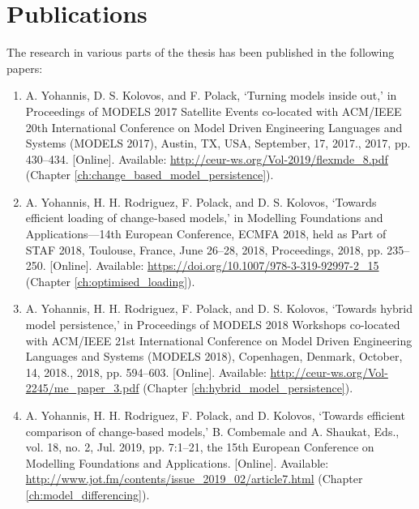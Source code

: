 \section{Publications}
\label{sec:publications}
The research in various parts of the thesis has been published in the following papers:
\begin{enumerate}
  \item A. Yohannis, D. S. Kolovos, and F. Polack, ‘Turning models inside out,’ in Proceedings of MODELS 2017 Satellite Events co-located with ACM/IEEE 20th International Conference on Model Driven Engineering Languages and Systems (MODELS 2017), Austin, TX, USA, September, 17, 2017., 2017, pp. 430–434. [Online]. Available: \url{http://ceur-ws.org/Vol-2019/flexmde_8.pdf} (Chapter \ref{ch:change_based_model_persistence}).
  
  \item A. Yohannis, H. H. Rodriguez, F. Polack, and D. S. Kolovos, ‘Towards efficient loading of change-based models,’ in Modelling Foundations and Applications—14th European Conference, ECMFA 2018, held as Part of STAF 2018, Toulouse, France, June 26–28, 2018, Proceedings, 2018, pp. 235–250. [Online]. Available: \url{https://doi.org/10.1007/978-3-319-92997-2_15} (Chapter \ref{ch:optimised_loading}).
  
  \item A. Yohannis, H. H. Rodriguez, F. Polack, and D. S. Kolovos, ‘Towards hybrid model persistence,’ in Proceedings of MODELS 2018 Workshops co-located with ACM/IEEE 21st International Conference on Model Driven Engineering Languages and Systems (MODELS 2018), Copenhagen, Denmark, October, 14, 2018., 2018, pp. 594–603. [Online]. Available: \url{http://ceur-ws.org/Vol-2245/me_paper_3.pdf} (Chapter \ref{ch:hybrid_model_persistence}).
  
  \item A. Yohannis, H. H. Rodriguez, F. Polack, and D. Kolovos, ‘Towards efficient comparison of change-based models,’ B. Combemale and A. Shaukat, Eds., vol. 18, no. 2, Jul. 2019, pp. 7:1–21, the 15th European Conference on Modelling Foundations and Applications. [Online]. Available:
  \url{http://www.jot.fm/contents/issue_2019_02/article7.html} (Chapter \ref{ch:model_differencing}).
\end{enumerate}
